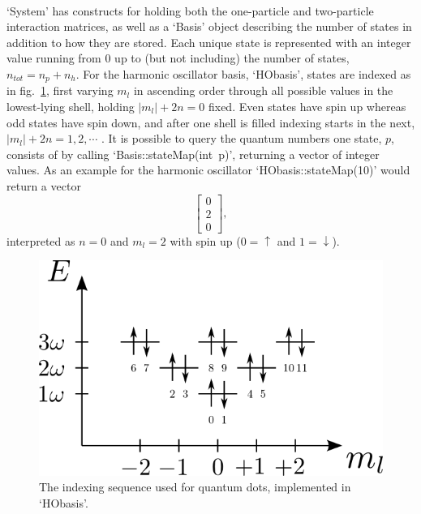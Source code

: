 \paragraph*{}
`System' has constructs for holding both the one-particle and two-particle interaction matrices, as well as a `Basis' object describing the number of states in addition to how they are stored.
Each unique state is represented with an integer value running from $0$ up to (but not including) the number of states, $n_{tot} = n_p + n_h $.
For the harmonic oscillator basis, `HObasis', states are indexed as in fig.~\ref{fig:qDots:qDotIndex}, first varying $m_l$ in ascending order through all possible values in the lowest-lying shell, holding $|m_l| + 2n = 0$ fixed.
Even states have spin up whereas odd states have spin down, and after one shell is filled indexing starts in the next, $|m_l| + 2n = 1,2,\cdots$ .
It is possible to query the quantum numbers one state, $p$, consists of by calling \mbox{`Basis::stateMap(int p)'}, returning a vector of integer values.
As an example for the harmonic oscillator \mbox{`HObasis::stateMap(10)'} would return a vector
\begin{equation}
\begin{bmatrix}
0 \\
2 \\
0
\end{bmatrix},
\end{equation}
interpreted as $n=0$ and $m_l = 2$ with spin up ($0=\uparrow$ and $1=\downarrow$).
\begin{figure}
\begin{center}
\includegraphics[scale=1.5]{../07-qDots/figs/spektrum.png}
\caption{The indexing sequence used for quantum dots, implemented in `HObasis'.}
\label{fig:qDots:qDotIndex}
\end{center}
\end{figure}



